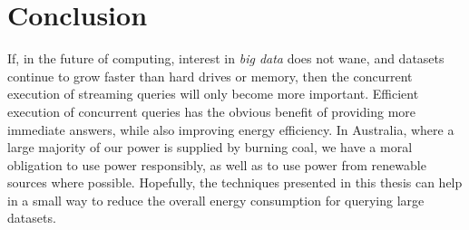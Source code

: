 \section{Conclusion}

If, in the future of computing, interest in \emph{big data} does not wane, and datasets continue to grow faster than hard drives or memory, then the concurrent execution of streaming queries will only become more important.
Efficient execution of concurrent queries has the obvious benefit of providing more immediate answers, while also improving energy efficiency.
In Australia, where a large majority of our power is supplied by burning coal, we have a moral obligation to use power responsibly, as well as to use power from renewable sources where possible.
Hopefully, the techniques presented in this thesis can help in a small way to reduce the overall energy consumption for querying large datasets.


